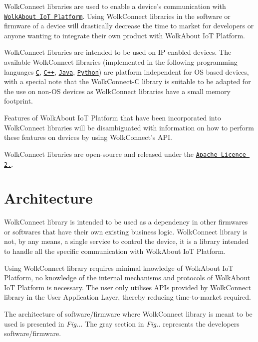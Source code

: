 Wolk\+Connect libraries are used to enable a device’s communication with \href{https://demo.wolkabout.com/#/login}{\tt Wolk\+About IoT Platform}. Using Wolk\+Connect libraries in the software or firmware of a device will drastically decrease the time to market for developers or anyone wanting to integrate their own product with Wolk\+About IoT Platform.

Wolk\+Connect libraries are intended to be used on IP enabled devices. The available Wolk\+Connect libraries (implemented in the following programming languages \href{https://github.com/Wolkabout/WolkConnect-C}{\tt C}, \href{https://github.com/Wolkabout/WolkConnect-Cpp}{\tt C++}, \href{https://github.com/Wolkabout/WolkConnect-Java-}{\tt Java}, \href{https://github.com/Wolkabout/WolkConnect-Python}{\tt Python}) are platform independent for OS based devices, with a special note that the Wolk\+Connect-\/C library is suitable to be adapted for the use on non-\/\+OS devices as Wolk\+Connect libraries have a small memory footprint.

Features of Wolk\+About IoT Platform that have been incorporated into Wolk\+Connect libraries will be disambiguated with information on how to perform these features on devices by using Wolk\+Connect’s A\+PI.

Wolk\+Connect libraries are open-\/source and released under the \href{https://github.com/Wolkabout/WolkConnect-C/blob/master/LICENSE}{\tt Apache Licence 2.}. 

 \section*{Architecture}





Wolk\+Connect library is intended to be used as a dependency in other firmwares or softwares that have their own existing business logic. Wolk\+Connect library is not, by any means, a single service to control the device, it is a library intended to handle all the specific communication with Wolk\+About IoT Platform.

Using Wolk\+Connect library requires minimal knowledge of Wolk\+About IoT Platform, no knowledge of the internal mechanisms and protocols of Wolk\+About IoT Platform is necessary. The user only utilises A\+P\+Is provided by Wolk\+Connect library in the User Application Layer, thereby reducing time-\/to-\/market required.

The architecture of software/firmware where Wolk\+Connect library is meant to be used is presented in {\itshape Fig..}. The gray section in {\itshape Fig..} represents the developer\textquotesingle{}s software/firmware.

